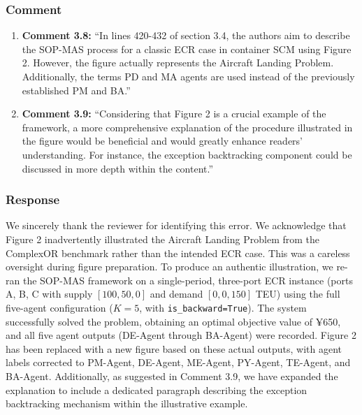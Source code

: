 \documentclass[11pt,a4paper]{article}
\begin{document}
\subsubsection{Comment}
\begin{enumerate}
\item \textbf{Comment 3.8: }``In lines 420-432 of section 3.4, the authors aim to describe the SOP-MAS process for a classic ECR case in container SCM using Figure 2. However, the figure actually represents the Aircraft Landing Problem. Additionally, the terms PD and MA agents are used instead of the previously established PM and BA.''
\item \textbf{Comment 3.9: }``Considering that Figure 2 is a crucial example of the framework, a more comprehensive explanation of the procedure illustrated in the figure would be beneficial and would greatly enhance readers' understanding. For instance, the exception backtracking component could be discussed in more depth within the content.''
\end{enumerate}

\subsubsection{Response}
We sincerely thank the reviewer for identifying this error. We acknowledge that Figure 2 inadvertently illustrated the Aircraft Landing Problem from the ComplexOR benchmark rather than the intended ECR case. This was a careless oversight during figure preparation. To produce an authentic illustration, we re-ran the SOP-MAS framework on a single-period, three-port ECR instance (ports A, B, C with supply $[100, 50, 0]$ and demand $[0, 0, 150]$ TEU) using the full five-agent configuration ($K{=}5$, with \texttt{is\_backward=True}). The system successfully solved the problem, obtaining an optimal objective value of ¥650, and all five agent outputs (DE-Agent through BA-Agent) were recorded. Figure 2 has been replaced with a new figure based on these actual outputs, with agent labels corrected to PM-Agent, DE-Agent, ME-Agent, PY-Agent, TE-Agent, and BA-Agent. Additionally, as suggested in Comment 3.9, we have expanded the explanation to include a dedicated paragraph describing the exception backtracking mechanism within the illustrative example.
\end{document}

